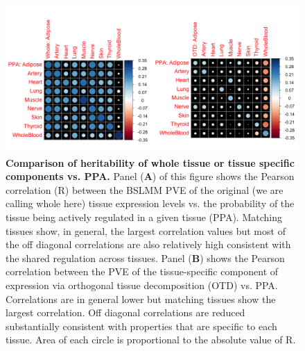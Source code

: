 \documentclass[10pt,letterpaper]{article}
\begin{document}
\begin{figure}[H]
\includegraphics[width=12cm]{Figures/Fig-cor-StephensPr-v-PVE.png}
\caption{{\bf Comparison of heritability of whole tissue or tissue specific components vs. PPA.} 
Panel (\textbf{A}) of this figure shows the Pearson correlation (R) between the BSLMM PVE of the original (we are calling whole here) tissue expression levels vs. the probability of the tissue being actively regulated in a given tissue (PPA). Matching tissues show, in general, the largest correlation values but most of the off diagonal correlations are also relatively high consistent with the shared regulation across tissues. 
Panel (\textbf{B}) shows the Pearson correlation between the PVE of the tissue-specific component of expression via orthogonal tissue decomposition (OTD) vs. PPA. Correlations are in general lower but matching tissues show the largest correlation. Off diagonal correlations are reduced substantially consistent with properties that are specific to each tissue. 
Area of each circle is proportional to the absolute value of R.
}
\label{fig-corrplot}
\end{figure}


\end{document}
